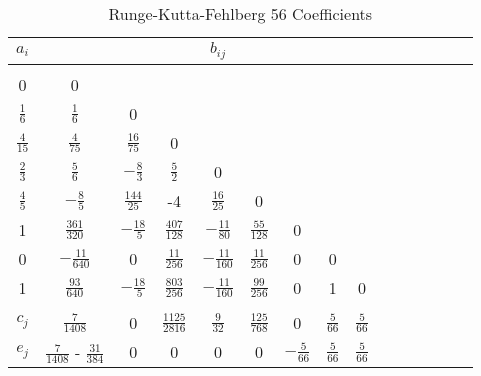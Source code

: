 

\begin{table*}[htb]
\centering \vspace{0 pt} \caption{Runge-Kutta-Fehlberg 56
Coefficients }
\begin{tabular}{c|cccccccccccccc}
   $a_i$ & & & & $b_{ij}$  \\
   \hline\hline
   \vspace{.1in} \\
    0 & 0 &  \vspace{.1in} \\
    $\frac{1}{6}$ &
    $\frac{1}{6}$ &
    0 &  \vspace{.1in} \\
    $\frac{4}{15}$ &
    $\frac{4}{75}$ &
    $\frac{16}{75}$ &
    0 & \vspace{.1in} \\
    $\frac{2}{3}$ &
    $\frac{5}{6}$ &
    $-\frac{8}{3}$ &
    $\frac{5}{2}$ &
    0 & \vspace{.1in} \\
    $\frac{4}{5}$ &
    $-\frac{8}{5}$ &
    $\frac{144}{25}$ &
    -4 &
    $\frac{16}{25}$ &
    0 & \vspace{.1in} \\
    1 &
    $\frac{361}{320}$ &
    $-\frac{18}{5}$ &
    $\frac{407}{128}$ &
    $-\frac{11}{80}$ &
    $\frac{55}{128}$ &
    0 & \vspace{.1in} \\
    0 &
    $-\frac{11}{640}$ &
    0 &
    $\frac{11}{256}$ &
    $-\frac{11}{160}$ &
    $\frac{11}{256}$ &
    0 &
    0 & \vspace{.1in} \\
    1 &
    $\frac{93}{640}$ &
    $-\frac{18}{5}$ &
    $\frac{803}{256}$ &
    $-\frac{11}{160}$ &
    $\frac{99}{256}$ &
    0 &
    1 &
    0 & \vspace{.1in} \\ \hline \\
    $c_j$ & $\frac{7}{1408}$ &
    0 &
    $\frac{1125}{2816}$ &
    $\frac{9}{32}$ &
    $\frac{125}{768}$ &
    0 &
    $\frac{5}{66}$ &
    $\frac{5}{66}$ & \vspace{.1in} \\
    $e_j$ & $\frac{7}{1408}$   - $\frac{31}{384}$ &
    0 &
    0 &
    0 &
    0 &
    $-\frac{5}{66}$ &
    $\frac{5}{66}$ &
    $\frac{5}{66}$ & \vspace{.1in} \\
  \hline\hline
\end{tabular}
\label{Table:RKF56Coefficients}
\end{table*}
